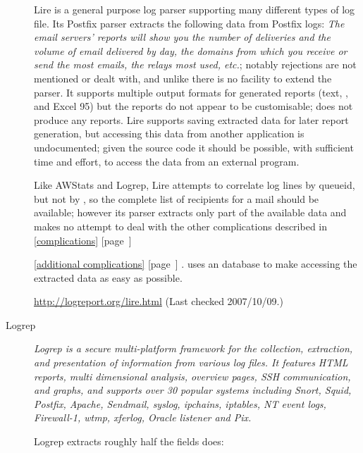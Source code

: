 \documentclass[a4paper,12pt,draft]{article}
\newcommand{\parsername}{\PLP{}}
\newcommand{\refwithpage}[1]{%
    \empty{}\ref{#1} [page~\pageref{#1}]%
}
\newcommand{\sectionref}[1]{%
    \textsection{}\refwithpage{#1}%
}
\begin{document}
\begin{description}
        Lire is a general purpose log parser supporting many different
        types of log file.  Its Postfix parser extracts the following data
        from Postfix logs: \textit{The email servers' reports will show you
        the number of deliveries and the volume of email delivered by day,
        the domains from which you receive or send the most emails, the
        relays most used, etc.\/}; notably rejections are not mentioned or
        dealt with, and unlike \parsername{} there is no facility to extend
        the parser.  It supports multiple output formats for generated
        reports (text, \HTML{}, \PDF{} and Excel 95) but the reports do not
        appear to be customisable; \parsername{} does not produce any
        reports.  Lire supports saving extracted data for later report
        generation, but accessing this data from another application is
        undocumented; given the source code it should be possible, with
        sufficient time and effort, to access the data from an external
        program.

        Like AWStats and Logrep, Lire attempts to correlate log lines by
        queueid, but not by \pid{}, so the complete list of recipients for
        a mail should be available; however its parser extracts only part
        of the available data and makes no attempt to deal with the other
        complications described in \sectionref{complications}
        \sectionref{additional complications}.  \parsername{} uses an
        \SQL{} database to make accessing the extracted data as easy as
        possible.

        \url{http://logreport.org/lire.html} \newline (Last checked
        2007/10/09.)

    \item [Logrep] \textit{Logrep is a secure multi-platform framework for
        the collection, extraction, and presentation of information from
        various log files. It features HTML reports, multi dimensional
        analysis, overview pages, SSH communication, and graphs, and
        supports over 30 popular systems including Snort, Squid, Postfix,
        Apache, Sendmail, syslog, ipchains, iptables, NT event logs,
        Firewall-1, wtmp, xferlog, Oracle listener and Pix.\/}

        Logrep extracts roughly half the fields \parsername{} does:

        \begin{itemize}


\end{itemize}
\end{description}
\end{document}

